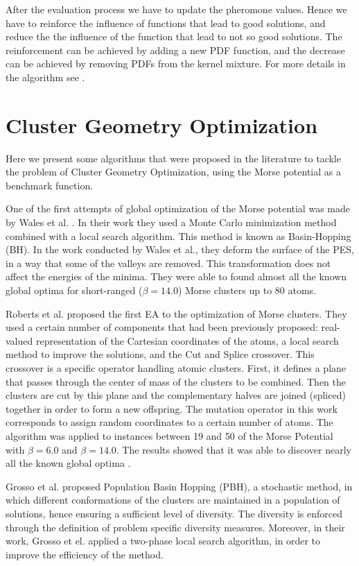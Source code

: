 						After the evaluation process we have to update the pheromone values. Hence we have to reinforce the influence of functions that lead to good solutions, and reduce the the influence of the function that lead to not so good solutions. The reinforcement can be achieved by adding a new PDF function, and the decrease can be achieved by removing PDFs from the kernel mixture.				
						For more details in the algorithm see \cite{socha04,socha08}.
								
	\section{Cluster Geometry Optimization}
		\label{subsec:cgo}
		Here we present some algorithms that were proposed in the literature to tackle the problem of Cluster Geometry Optimization, using the Morse potential as a benchmark function.

		One of the first attempts of global optimization of the Morse potential was made by Wales et al. \cite{wales97, doye97}. In their work they used a Monte Carlo minimization method \cite{li87} combined with a local search algorithm. This method is known as Basin-Hopping (BH). In the work conducted by Wales et al., they deform the surface of the PES, in a way that some of the valleys are removed. This transformation does not affect the energies of the minima. They were able to found almost all the known global optima for short-ranged ($\beta = 14.0$) Morse clusters up to 80 atoms.
		
		Roberts et al. \cite{roberts00} proposed the first EA to the optimization of Morse clusters. They used a certain number of components that had been previously proposed: real-valued representation of the Cartesian coordinates of the atoms, a local search method to improve the solutions, and the Cut and Splice \cite{deaven95} crossover. This crossover is a specific operator handling atomic clusters. First, it defines a plane that passes through the center of mass of the clusters to be combined. Then the clusters are cut by this plane and the complementary halves are joined (spliced) together in order to form a new offspring.
		The mutation operator in this work corresponds to assign random coordinates to a certain number of atoms. 
		The algorithm was applied to instances between 19 and 50 of the Morse Potential with $\beta = 6.0$ and $\beta = 14.0$. The results showed that it was able to discover nearly all the known global optima \cite{roberts00}.   
		
		Grosso et al. \cite{grosso07} proposed Population Basin Hopping (PBH), a stochastic method, in which different conformations of the clusters are maintained in a population of solutions, hence ensuring a sufficient level of diversity. The diversity is enforced through the definition of problem specific diversity measures. Moreover, in their work, Grosso et el. applied a two-phase local search algorithm, in order to improve the efficiency of the method.
		
